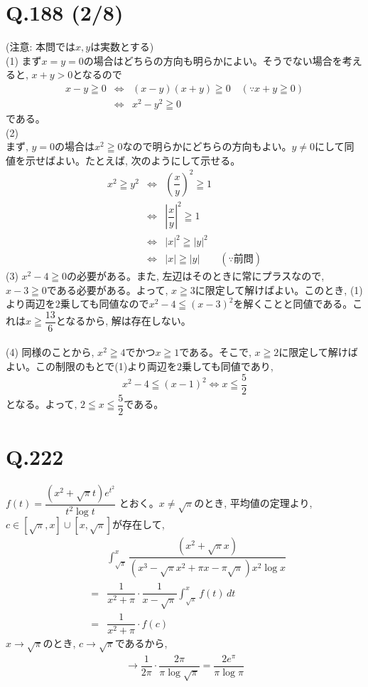 \documentclass[twocolumn]{jbook}
\newcommand{\abs}[1]{\left|#1\right|}
\newcommand{\disp}{\displaystyle}
\newcommand{\dou}{\Leftrightarrow}
\newcommand{\beqn}{\begin{eqnarray*}}
\newcommand{\eeqn}{\end{eqnarray*}}
\renewcommand{\leq}{\leqq}
\renewcommand{\geq}{\geqq}
\newcommand{\parena}[1]{\left( #1\right)}
\begin{document}
\section*{Q.188 (2/8)}
(注意: 本問では$x,y$は実数とする)\\
(1) まず$x=y=0$の場合はどちらの方向も明らかによい。そうでない場合を考えると, $x+y > 0$となるので
\beqn
x-y\geq 0 &\dou& (x-y)(x+y)\geq 0\quad (\because x+y\geq 0)\\
&\dou& x^2 - y^2 \geq 0 
\eeqn
である。\\
(2) \\
まず, $y=0$の場合は$x^2\geq 0$なので明らかにどちらの方向もよい。$y\neq 0$にして同値を示せばよい。たとえば, 次のようにして示せる。
\beqn
x^2 \geq y^2 &\dou& \parena{\dfrac{x}{y}}^2 \geq 1\\
&\dou& \abs{\dfrac{x}{y}}^2 \geq 1\\
&\dou & |x|^2 \geq |y|^2\\
&\dou& |x| \geq |y|\qquad (\because \mbox{前問})
\eeqn
(3) $x^2 - 4\geq 0$の必要がある。また, 左辺はそのときに常にプラスなので, $x-3\geq 0$である必要がある。よって, $x\geq 3$に限定して解けばよい。このとき, (1)より両辺を$2$乗しても同値なので$x^2 - 4 \leq (x-3)^2$を解くことと同値である。これは$x\geq \dfrac{13}{6}$となるから, 解は存在しない。\\
\\
(4) 同様のことから, $x^2\geq 4$でかつ$x\geq 1$である。そこで, $x\geq 2$に限定して解けばよい。この制限のもとで(1)より両辺を$2$乗しても同値であり, 
\[ x^2-4 \leq (x-1)^2 \dou x\leq \dfrac{5}{2}\]
となる。よって, $2\leq x\leq \dfrac{5}{2}$である。

\section*{Q.222}
$f(t) = \dfrac{(x^2 + \sqrt{\pi}t)e^{t^2}}{t^2\log{t}}$ とおく。$x\neq \sqrt{\pi}$のとき, 平均値の定理より, $c\in [\sqrt{\pi},x]\cup [x,\sqrt{\pi}]$が存在して, 
\beqn
&&\disp\int_{\sqrt{\pi}}^{x} \dfrac{(x^2 + \sqrt{\pi}x)}{(x^3 - \sqrt{\pi}x^2 + \pi x - \pi\sqrt{\pi})x^2\log{x}}\\
&=& \dfrac{1}{x^2+\pi}\cdot \dfrac{1}{x-\sqrt{\pi}}\disp\int_{\sqrt{\pi}}^{x} f(t)\, dt\\
&=& \dfrac{1}{x^2+\pi}\cdot f(c)
\eeqn
$x\to \sqrt{\pi}$のとき, $c\to \sqrt{\pi}$であるから, 
\beqn
\to \dfrac{1}{2\pi}\cdot \dfrac{2\pi}{\pi\log{\sqrt{\pi}}} = \dfrac{2e^{\pi}}{\pi\log{\pi}}
\eeqn

\clearpage
\end{document}
